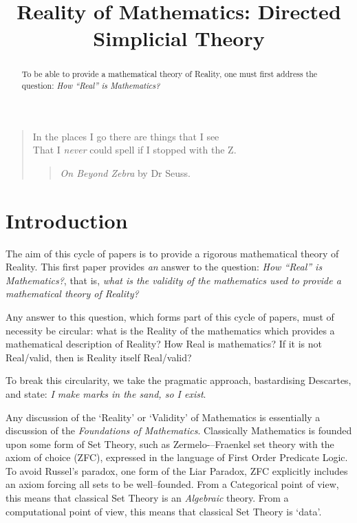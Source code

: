 \documentclass[a4paper,openany]{amsbook}
\begin{document}
\frontmatter
\sloppy

\title[DiSimplicial Theory]{Reality of Mathematics: Directed Simplicial Theory}

%

\begin{abstract}
To be able to provide a mathematical theory of Reality, one must first 
address the question: \textit{How ``Real'' is Mathematics?}
\end{abstract} 
\maketitle 
\tableofcontents 
\mainmatter

\begin{quotation}
In the places I go there are things that I see\\
That I \emph{never} could spell if I stopped with the Z.\\
\begin{quote}
\textit{On Beyond Zebra} by Dr Seuss.
\end{quote}
\end{quotation}

\section{Introduction}

The aim of this cycle of papers is to provide a rigorous mathematical theory of
Reality. This first paper provides \emph{an} answer to the question: \emph{How
``Real'' is Mathematics?}, that is, \emph{what is the validity of the
mathematics used to provide a mathematical theory of Reality?}

Any answer to this question, which forms part of this cycle of papers, must of
necessity be circular: what is the Reality of the mathematics which provides a
mathematical description of Reality? How Real is mathematics? If it is not
Real/valid, then is Reality itself Real/valid?

To break this circularity, we take the pragmatic approach, bastardising
Descartes, and state: \emph{I make marks in the sand, so I exist}.

Any discussion of the `Reality' or `Validity' of Mathematics is essentially a
discussion of the \textit{Foundations of Mathematics}. Classically Mathematics
is founded upon some form of Set Theory, such as Zermelo-–Fraenkel set theory
with the axiom of choice (ZFC), expressed in the language of First Order
Predicate Logic. To avoid Russel's paradox, one form of the Liar Paradox, ZFC
explicitly includes an axiom forcing all sets to be well--founded. From a
Categorical point of view, this means that classical Set Theory is an
\emph{Algebraic} theory. From a computational point of view, this means that
classical Set Theory is `data'.
\end{document}
